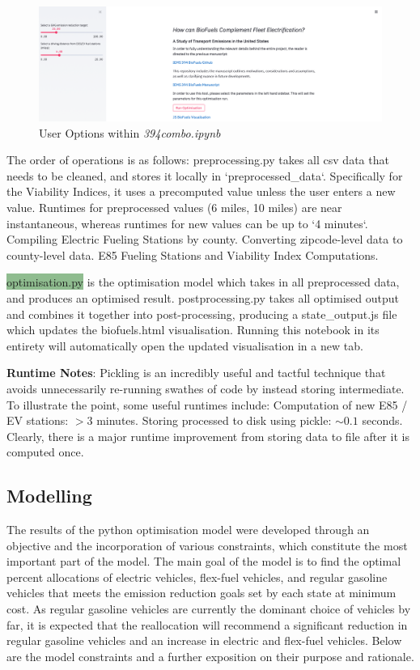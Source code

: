 \documentclass[answers]{exam}
\begin{document}
\begin{figure}[h]
    \centering
    \includegraphics[scale=0.4]{user_options.png}
    \caption{User Options within \textit{394combo.ipynb}}
    \label{fig:my_label}
\end{figure}
\begin{outline}
The order of operations is as follows:
\2\colorbox{dandelion}{preprocessing.py} takes all csv data that needs to be cleaned, and stores it locally in `preprocessed\_data`. Specifically for the Viability Indices, it uses a precomputed value unless the user enters a new value. Runtimes for preprocessed values (6 miles, 10 miles) are near instantaneous, whereas runtimes for new values can be up to `4 minutes`.
\3 Compiling Electric Fueling Stations by county.
\3 Converting zipcode-level data to county-level data.
\3 E85 Fueling Stations and Viability Index Computations.

\2 \colorbox{darkseagreen}{optimisation.py} is the optimisation model which takes in all preprocessed data, and produces an optimised result.
\2 \colorbox{babyblue}{postprocessing.py} takes all optimised output and combines it together into post-processing, producing a \colorbox{mediumlavendermagenta}{state\_output.js} file which updates the \colorbox{lilac}{biofuels.html} visualisation. Running this notebook in its entirety will automatically open the updated visualisation in a new tab.

\0 \textbf{Runtime Notes}: 
\2 Pickling is an incredibly useful and tactful technique that avoids unnecessarily re-running swathes of code by instead storing intermediate. To illustrate the point, some useful runtimes include:
\3 Computation of new E85 / EV stations: $>3$ minutes.
\3 Storing processed to disk using pickle: $\sim0.1$ seconds.
\2 Clearly, there is a major runtime improvement from storing data to file after it is computed once. 
\end{outline}
\subsection{Modelling}
The results of the python optimisation model were developed through an objective and the incorporation of various constraints, which constitute the most important part of the model. The main goal of the model is to find the optimal percent allocations of electric vehicles, flex-fuel vehicles, and regular gasoline vehicles that meets the emission reduction goals set by each state at minimum cost. As regular gasoline vehicles are currently the dominant choice of vehicles by far, it is expected that the reallocation will recommend a significant reduction in regular gasoline vehicles and an increase in electric and flex-fuel vehicles. Below are the model constraints and a further exposition on their purpose and rationale. 
\end{document}
